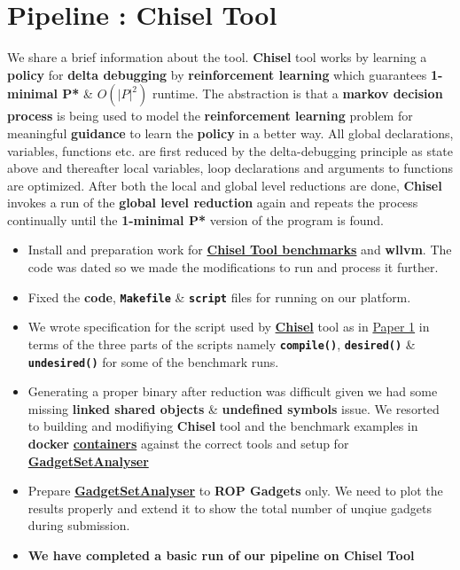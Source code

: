 \documentclass{article} %
\begin{document}
\section*{\color{darkmidnightblue} Pipeline : Chisel Tool} 
We share a brief information about the tool. \textbf{Chisel} tool works by learning a \textbf{policy} for \textbf{delta debugging} by \textbf{reinforcement learning} which guarantees \textbf{1-minimal P*} \& $\textbf{$O(|P|^2)$}$ runtime. The abstraction is that a \textbf{markov decision process} is being used to model the \textbf{reinforcement learning} problem for meaningful \textbf{guidance} to learn the \textbf{policy} in a better way. All global declarations, variables, functions etc. are first reduced by the delta-debugging principle as state above and thereafter local variables, loop declarations and arguments to functions are optimized. After both the local and global level reductions are done, \textbf{Chisel} invokes a run of the \textbf{global level reduction} again and repeats the process continually until the \textbf{1-minimal P*} version of the program is found. 
\begin{itemize}
	\item Install and preparation work for \textbf{\href{https://github.com/lahiri-phdworks/chisel-bench}{Chisel Tool benchmarks}} and \textbf{wllvm}. The code was dated so we made the modifications to run and process it further. 
	\item Fixed the \textbf{code}, \textbf{\texttt{Makefile}} \& \textbf{\texttt{script}} files for running on our platform. 
	\item We wrote specification for the script used by \textbf{\href{https://github.com/aspire-project/chisel}{Chisel}} tool as in \href{https://dl.acm.org/doi/10.1145/3243734.3243838}{Paper 1} in terms of the three parts of the scripts namely \textbf{\texttt{compile()}}, \textbf{\texttt{desired()}} \& \texttt{\textbf{undesired()}} for some of the benchmark runs.
	\item Generating a proper binary after reduction was difficult given we had some missing \textbf{linked shared objects} \& \textbf{undefined symbols} issue. We resorted to building and modifiying \textbf{Chisel} tool and the benchmark examples in \textbf{docker} \textbf{\href{https://hub.docker.com/r/prodrelworks/chisel-tool}{containers}} against the correct tools and setup for \textbf{\href{https://github.com/michaelbrownuc/GadgetSetAnalyzer}{GadgetSetAnalyser}}
	\item Prepare \textbf{\href{https://github.com/michaelbrownuc/GadgetSetAnalyzer}{GadgetSetAnalyser}} to \textbf{ROP Gadgets} only. We need to plot the results properly and extend it to show the total number of unqiue gadgets during submission. 
	\item \textbf{\color{ao(english)} We have completed a basic run of our pipeline on Chisel Tool}
\end{itemize}
\end{document}
